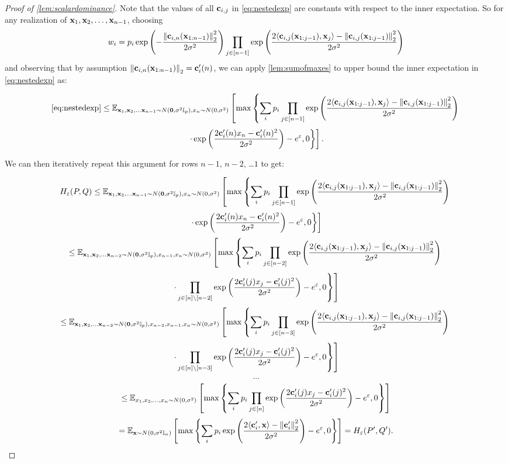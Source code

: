 \begin{proof}[Proof of \cref{lem:scalardominance}]
Note that the values of all $\mathbf{c}_{i,j}$ in \eqref{eq:nestedexp} are constants with respect to the inner expectation. So for any realization of $\mathbf{x}_1, \mathbf{x}_2, \ldots, \mathbf{x}_{n-1}$, choosing
\[w_i = p_i \exp\left(-\frac{ \left\|\mathbf{c}_{i,n}(\mathbf{x}_{1:n-1})\right\|_2^2}{ 2\sigma^2}\right) \prod_{j \in [n-1]}\exp\left(\frac{2 \langle \mathbf{c}_{i,j}(\mathbf{x}_{1:j-1}), \mathbf{x}_j \rangle - \left\|\mathbf{c}_{i,j}(\mathbf{x}_{1:j-1})\right\|_2^2}{ 2\sigma^2}\right)\]
and observing that by assumption $\left\|\mathbf{c}_{i,n}(\mathbf{x}_{1:n-1})\right\|_2 = \mathbf{c}'_{i}(n)$, we can apply \cref{lem:sumofmaxes} to upper bound the inner expectation in \eqref{eq:nestedexp} as:

\[\eqref{eq:nestedexp} \leq \mathbb{E}_{\mathbf{x}_1, \mathbf{x}_2, \ldots \mathbf{x}_{n-1} \sim N(\boldsymbol{0}, \sigma^2 \mathbb{I}_{p}), x_n \sim N(0, \sigma^2)}\left[\max\left\{\sum_i p_i \prod_{j \in [n-1]} \exp\left(\frac{2 \langle \mathbf{c}_{i,j}(\mathbf{x}_{1:j-1}), \mathbf{x}_j \rangle- \left\|\mathbf{c}_{i,j}(\mathbf{x}_{1:j-1})\right\|_2^2}{ 2\sigma^2}\right)\right.\right.\]
\[\left.\left. \cdot \exp\left(\frac{2 \mathbf{c}'_i(n) x_n - \mathbf{c}'_i(n)^2}{ 2\sigma^2}\right) - e^\varepsilon, 0\right\}\right].\]

We can then iteratively repeat this argument for rows $n-1$, $n-2$, \ldots $1$ to get:

\[H_{\varepsilon}(P, Q) \leq \mathbb{E}_{\mathbf{x}_1, \mathbf{x}_2, \ldots \mathbf{x}_{n-1} \sim N(\boldsymbol{0}, \sigma^2 \mathbb{I}_{p}), x_n \sim N(0, \sigma^2)}\left[\max\left\{\sum_i p_i \prod_{j \in [n-1]} \exp\left(\frac{2 \langle \mathbf{c}_{i,j}(\mathbf{x}_{1:j-1}), \mathbf{x}_j \rangle- \left\|\mathbf{c}_{i,j}(\mathbf{x}_{1:j-1})\right\|_2^2}{ 2\sigma^2}\right)\right.\right.\]
\[\left.\left. \cdot \exp\left(\frac{2 \mathbf{c}'_i(n) x_n - \mathbf{c}'_i(n)^2}{ 2\sigma^2}\right) - e^\varepsilon, 0\right\}\right]\]
\[\leq \mathbb{E}_{\mathbf{x}_1, \mathbf{x}_2, \ldots \mathbf{x}_{n-2} \sim N(\boldsymbol{0}, \sigma^2 \mathbb{I}_{p}), x_{n-1}, x_n \sim N(0, \sigma^2)}\left[\max\left\{\sum_i p_i \prod_{j \in [n-2]} \exp\left(\frac{2 \langle \mathbf{c}_{i,j}(\mathbf{x}_{1:j-1}), \mathbf{x}_j \rangle- \left\|\mathbf{c}_{i,j}(\mathbf{x}_{1:j-1})\right\|_2^2}{ 2\sigma^2}\right)\right.\right.\]
\[\left.\left. \cdot \prod_{j \in [n] \setminus [n-2]} \exp\left(\frac{2 \mathbf{c}'_i(j) x_j - \mathbf{c}'_i(j)^2}{ 2\sigma^2}\right) - e^\varepsilon, 0\right\}\right]\]
\[\leq \mathbb{E}_{\mathbf{x}_1, \mathbf{x}_2, \ldots \mathbf{x}_{n-3} \sim N(\boldsymbol{0}, \sigma^2 \mathbb{I}_{p}), x_{n-2}, x_{n-1}, x_n \sim N(0, \sigma^2)}\left[\max\left\{\sum_i p_i \prod_{j \in [n-3]} \exp\left(\frac{2 \langle \mathbf{c}_{i,j}(\mathbf{x}_{1:j-1}), \mathbf{x}_j \rangle- \left\|\mathbf{c}_{i,j}(\mathbf{x}_{1:j-1})\right\|_2^2}{ 2\sigma^2}\right)\right.\right.\]
\[\left.\left. \cdot \prod_{j \in [n] \setminus [n-3]} \exp\left(\frac{2 \mathbf{c}'_i(j) x_j - \mathbf{c}'_i(j)^2}{ 2\sigma^2}\right) - e^\varepsilon, 0\right\}\right]\]
\[\ldots\]
\[\leq \mathbb{E}_{x_1, x_2, \ldots, x_n \sim N(0, \sigma^2)}\left[\max\left\{\sum_i p_i \prod_{j \in [n]} \exp\left(\frac{2 \mathbf{c}'_i(j) x_j - \mathbf{c}'_i(j)^2}{ 2\sigma^2}\right) - e^\varepsilon, 0\right\}\right]\]
\[= \mathbb{E}_{\mathbf{x} \sim N(0, \sigma^2 \mathbb{I}_n)}\left[\max\left\{\sum_i p_i  \exp\left(\frac{2 \langle \mathbf{c}_i', \mathbf{x} \rangle - \left\|\mathbf{c}_i'\right\|_2^2}{ 2\sigma^2}\right) - e^\varepsilon, 0\right\}\right] = H_\varepsilon(P', Q').\]
\end{proof}

